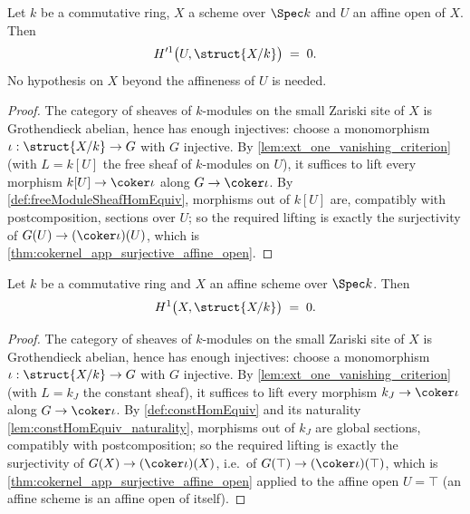 \begin{theorem}
  \label{thm:affine_open_h1_vanishing}
  \leanok
  Let \(k\) be a commutative ring, \(X\) a scheme over \(\Spec k\) and \(U\) an affine open
  of \(X\). Then
  \[
    H'^1\bigl(U, \struct{X/k}\bigr) \;=\; 0 .
  \]
  No hypothesis on \(X\) beyond the affineness of \(U\) is needed.
\end{theorem}
\begin{proof}
  \leanok
  The category of sheaves of \(k\)-modules on the small Zariski site of \(X\) is Grothendieck
  abelian, hence has enough injectives: choose a monomorphism
  \(\iota : \struct{X/k} \to G\) with \(G\) injective. By
  \ref{lem:ext_one_vanishing_criterion} (with \(L = k[U]\) the free sheaf of \(k\)-modules on
  \(U\)), it suffices to lift every morphism \(k[U] \to \coker \iota\) along
  \(G \to \coker \iota\). By \ref{def:freeModuleSheafHomEquiv}, morphisms out of \(k[U]\) are,
  compatibly with postcomposition, sections over \(U\); so the required lifting is exactly
  the surjectivity of \(G(U) \to (\coker \iota)(U)\), which is
  \ref{thm:cokernel_app_surjective_affine_open}.
\end{proof}

\begin{theorem}
  \label{thm:affine_vanishing}
  \leanok
  Let \(k\) be a commutative ring and \(X\) an affine scheme over \(\Spec k\). Then
  \[
    H^1\bigl(X, \struct{X/k}\bigr) \;=\; 0 .
  \]
\end{theorem}
\begin{proof}
  \leanok
  The category of sheaves of \(k\)-modules on the small Zariski site of \(X\) is Grothendieck
  abelian, hence has enough injectives: choose a monomorphism
  \(\iota : \struct{X/k} \to G\) with \(G\) injective. By
  \ref{lem:ext_one_vanishing_criterion} (with \(L = k_J\) the constant sheaf), it suffices to
  lift every morphism \(k_J \to \coker \iota\) along \(G \to \coker \iota\). By
  \ref{def:constHomEquiv} and its naturality \ref{lem:constHomEquiv_naturality}, morphisms
  out of \(k_J\) are global sections, compatibly with postcomposition; so the required
  lifting is exactly the surjectivity of \(G(X) \to (\coker \iota)(X)\), i.e.\ of
  \(G(\top) \to (\coker \iota)(\top)\), which is
  \ref{thm:cokernel_app_surjective_affine_open} applied to the affine open \(U = \top\)
  (an affine scheme is an affine open of itself).
\end{proof}

